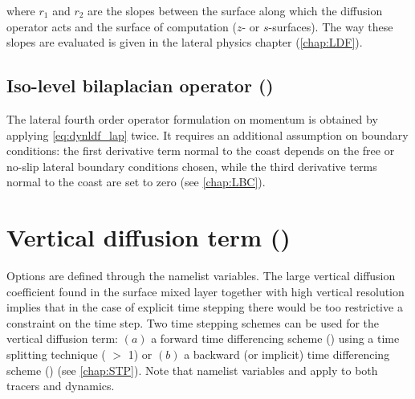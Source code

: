 \documentclass[../tex_main/NEMO_manual]{subfiles}
\begin{document}
where $r_1$ and $r_2$ are the slopes between the surface along which the diffusion operator acts and
the surface of computation ($z$- or $s$-surfaces). 
The way these slopes are evaluated is given in the lateral physics chapter (\autoref{chap:LDF}).

\subsection[Iso-level bilaplacian (\protect\np{ln\_dynldf\_bilap}\forcode{ = .true.})]
				{Iso-level bilaplacian operator (\protect{})}
\label{subsec:DYN_ldf_bilap}

The lateral fourth order operator formulation on momentum is obtained by applying \autoref{eq:dynldf_lap} twice.
It requires an additional assumption on boundary conditions:
the first derivative term normal to the coast depends on the free or no-slip lateral boundary conditions chosen,
while the third derivative terms normal to the coast are set to zero (see \autoref{chap:LBC}).

\section{Vertical diffusion term (\protect{})}
\label{sec:DYN_zdf}


Options are defined through the  namelist variables.
The large vertical diffusion coefficient found in the surface mixed layer together with high vertical resolution implies that in the case of explicit time stepping there would be too restrictive a constraint on the time step.
Two time stepping schemes can be used for the vertical diffusion term:
$(a)$ a forward time differencing scheme
() using a time splitting technique ( $>$ 1) or
$(b)$ a backward (or implicit) time differencing scheme ()
(see \autoref{chap:STP}).
Note that namelist variables  and  apply to both tracers and dynamics. 
\end{document}
